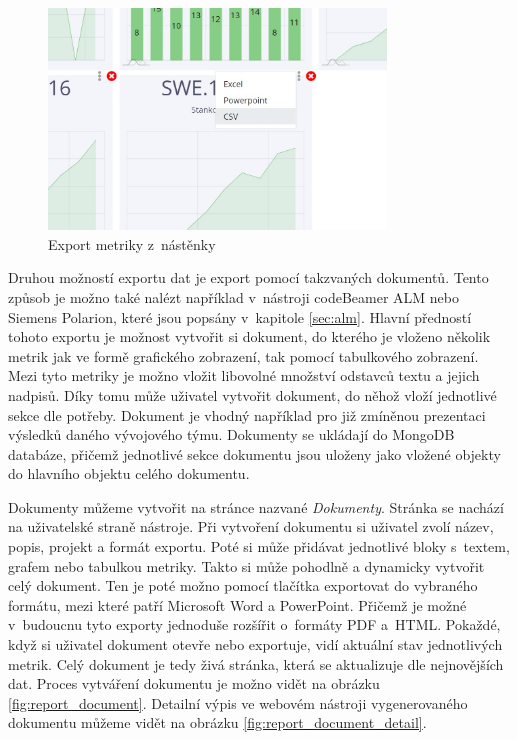 \documentclass[czech,master]{diploma}
\begin{document}
\begin{figure}[!ht]
    \centering
    \includegraphics[width=0.8\textwidth]{Diplomka/Figures/dashboard_export.jpg}
    \caption{Export metriky z~nástěnky}
    \label{fig:dashboard_export}
\end{figure}

Druhou možností exportu dat je export pomocí takzvaných dokumentů. Tento způsob je možno také nalézt například v~nástroji codeBeamer ALM nebo Siemens Polarion, které jsou popsány v~kapitole \ref{sec:alm}. Hlavní předností tohoto exportu je možnost vytvořit si dokument, do kterého je vloženo několik metrik jak ve formě grafického zobrazení, tak pomocí tabulkového zobrazení. Mezi tyto metriky je možno vložit libovolné množství odstavců textu a jejich nadpisů. Díky tomu může uživatel vytvořit dokument, do něhož vloží jednotlivé sekce dle potřeby. Dokument je vhodný například pro již zmíněnou prezentaci výsledků daného vývojového týmu. Dokumenty se ukládají do MongoDB databáze, přičemž jednotlivé sekce dokumentu jsou uloženy jako vložené objekty do hlavního objektu celého dokumentu.

Dokumenty můžeme vytvořit na stránce nazvané \textit{Dokumenty}. Stránka se nachází na uživatelské straně nástroje. Při vytvoření dokumentu si uživatel zvolí název, popis, projekt a formát exportu. Poté si může přidávat  jednotlivé bloky s~textem, grafem nebo tabulkou metriky. Takto si může pohodlně a dynamicky vytvořit celý dokument. Ten je poté možno pomocí tlačítka exportovat do vybraného formátu, mezi které patří Microsoft Word a PowerPoint. Přičemž je možné v~budoucnu tyto exporty jednoduše rozšířit o~formáty PDF a~HTML. Pokaždé, když si uživatel dokument otevře nebo exportuje, vidí aktuální stav jednotlivých metrik. Celý dokument je tedy živá stránka, která se aktualizuje dle nejnovějších dat. Proces vytváření dokumentu je možno vidět na obrázku \ref{fig:report_document}. Detailní výpis ve webovém nástroji vygenerovaného dokumentu můžeme vidět na obrázku \ref{fig:report_document_detail}.
\end{document}
